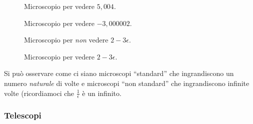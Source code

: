 \begin{figure}[h]
\begin{inaccessibleblock}

\begin{minipage}{.48\linewidth}
 \begin{center}
\microscopioa
 \end{center}
\caption{Microscopio per vedere \(5,004\).} \label{fig:microscopioa}
\end{minipage}
\hfill
\begin{minipage}{.48\linewidth}
 \begin{center}
\microscopiob
 \end{center}
\caption{Microscopio per vedere \(-3,000002\).} \label{fig:microscopiob}
\end{minipage}

\end{inaccessibleblock}
\end{figure}
 
\begin{figure}[h]
\begin{inaccessibleblock}

\begin{minipage}{.48\linewidth}
 \begin{center}
\microscopioc
 \end{center}
\caption{Microscopio per \emph{non} vedere \(2-3\epsilon\).} 
\label{fig:microscopioc}
\end{minipage}
\hfill
\begin{minipage}{.48\linewidth}
 \begin{center}
\microscopiod
 \end{center}
\caption{Microscopio per vedere \(2-3\epsilon\).} \label{fig:microscopiod}
\end{minipage}

\end{inaccessibleblock}
\end{figure}
 
Si può osservare come ci siano microscopi ``standard'' che ingrandiscono un 
numero \emph{naturale} di volte e microscopi ``non standard'' che 
ingrandiscono infinite volte (ricordiamoci che \(\frac{1}{\epsilon}\) è un 
infinito.

\newpage %

\subsubsection{Telescopi}
\label{subsec:insnum_telescopi}

